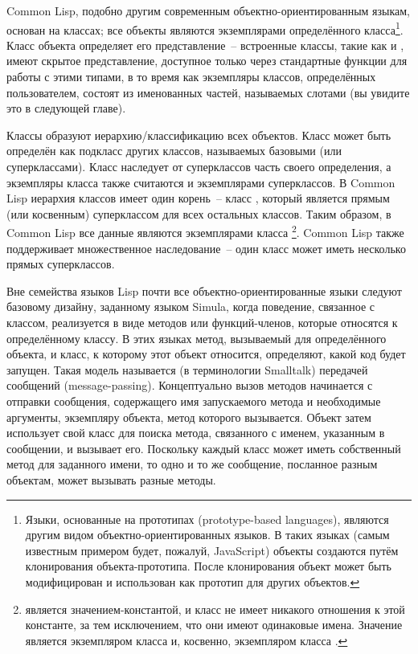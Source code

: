 Common Lisp, подобно другим современным объектно-ориентированным языкам, основан на
классах; все объекты являются экземплярами определённого класса\footnote{Языки, основанные
  на прототипах (prototype-based languages), являются другим видом объектно-ориентированных
  языков. В таких языках (самым известным примером будет, пожалуй, JavaScript) объекты
  создаются путём клонирования объекта-прототипа. После клонирования объект может быть
  модифицирован и использован как прототип для других объектов.}.  Класс объекта
определяет его представление~-- встроенные классы, такие как  и ,
имеют скрытое представление, доступное только через стандартные функции для работы с этими
типами, в то время как экземпляры классов, определённых пользователем, состоят из
именованных частей, называемых слотами (вы увидите это в следующей главе).

Классы образуют иерархию/классификацию всех объектов.  Класс может быть определён как
подкласс других классов, называемых базовыми (или суперклассами).  Класс наследует от
суперклассов часть своего определения, а экземпляры класса также считаются и экземплярами
суперклассов.  В Common Lisp иерархия классов имеет один корень~-- класс , который
является прямым (или косвенным) суперклассом для всех остальных классов.  Таким образом, в
Common Lisp все данные являются экземплярами класса \footnote{ является
  значением-константой, и класс  не имеет никакого отношения к этой константе, за
  тем исключением, что они имеют одинаковые имена.  Значение  является экземпляром
  класса  и, косвенно, экземпляром класса .}.  Common Lisp также
поддерживает множественное наследование~-- один класс может иметь несколько прямых
суперклассов.

Вне семейства языков Lisp почти все объектно-ориентированные языки следуют базовому
дизайну, заданному языком Simula, когда поведение, связанное с классом, реализуется в виде
методов или функций-членов, которые относятся к определённому классу.  В этих языках
метод, вызываемый для определённого объекта, и класс, к которому этот объект относится,
определяют, какой код будет запущен.  Такая модель называется (в терминологии Smalltalk)
передачей сообщений (message-passing).  Концептуально вызов методов начинается с отправки
сообщения, содержащего имя запускаемого метода и необходимые аргументы, экземпляру
объекта, метод которого вызывается.  Объект затем использует свой класс для поиска метода,
связанного с именем, указанным в сообщении, и вызывает его.  Поскольку каждый класс может
иметь собственный метод для заданного имени, то одно и то же сообщение, посланное разным
объектам, может вызывать разные методы.

